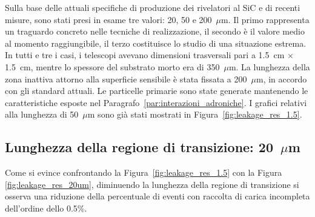Sulla base delle attuali specifiche di produzione dei rivelatori al SiC e di recenti misure, sono stati presi in esame tre valori: 20, 50 e 200~$\mu$m.
Il primo rappresenta un traguardo concreto nelle tecniche di realizzazione, il secondo è il valore medio al momento raggiungibile, il terzo costituisce lo studio di una situazione estrema.
In tutti e tre i casi, i telescopi avevano dimensioni trasversali pari a 1.5~cm $\times$ 1.5~cm, mentre lo spessore del substrato morto era di 350~$\mu$m.
La lunghezza della zona inattiva attorno alla superficie sensibile è stata fissata a 200~$\mu$m, in accordo con gli standard attuali.
Le particelle primarie sono state generate mantenendo le caratteristiche esposte nel Paragrafo~\ref{par:interazioni_adroniche}.
I grafici relativi alla lunghezza di 50~$\mu$m sono già stati mostrati in Figura~\ref{fig:leakage_res_1.5}.



\subsection*{Lunghezza della regione di transizione: 20~$\mu$m}

Come si evince confrontando la Figura~\ref{fig:leakage_res_1.5} con la Figura~ \ref{fig:leakage_res_20um}, diminuendo la lunghezza della regione di transizione si osserva una riduzione della percentuale di eventi con raccolta di carica incompleta dell'ordine dello 0.5\%.



